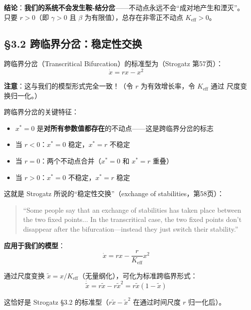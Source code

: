 \documentclass[12pt,a4paper]{article}
\begin{document}
\textbf{结论}：\textbf{我们的系统不会发生鞍-结分岔}——不动点永远不会``成对地产生和湮灭''。
只要 $r > 0$（即 $\gamma > 0$ 且 $\beta$ 为有限值），总存在非零正不动点 $K_{\text{eff}} > 0$。

\subsection{\S3.2 跨临界分岔：稳定性交换}

跨临界分岔（Transcritical Bifurcation）的标准型为（Strogatz 第57页）：
\begin{equation}
\dot{x} = r x - x^2
\end{equation}

\textbf{注意}：这与我们的模型形式完全一致！（令 $r$ 为有效增长率，令 $K_{\text{eff}}$ 通过
尺度变换归一化。）

跨临界分岔的关键特征：
\begin{itemize}
  \item $x^* = 0$ 是\textbf{对所有参数值都存在}的不动点——这是跨临界分岔的标志
  \item 当 $r < 0$：$x^* = 0$ 稳定，$x^* = r$ 不稳定
  \item 当 $r = 0$：两个不动点合并（$x^* = 0$ 和 $x^* = r$ 重叠）
  \item 当 $r > 0$：$x^* = 0$ 不稳定，$x^* = r$ 稳定
\end{itemize}

这就是 Strogatz 所说的``稳定性交换''（exchange of stabilities，第58页）：

\begin{quote}
\small
``Some people say that an exchange of stabilities has taken place between the two fixed points...
In the transcritical case, the two fixed points don't disappear after the bifurcation—instead
they just switch their stability.''
\end{quote}

\textbf{应用于我们的模型}：
\begin{equation}
\dot{x} = r x - \frac{r}{K_{\text{eff}}} x^2
\end{equation}

通过尺度变换 $\tilde{x} = x / K_{\text{eff}}$（无量纲化），可化为标准跨临界形式：
\begin{equation}
\dot{\tilde{x}} = r \tilde{x} - r \tilde{x}^2 = r \tilde{x}(1 - \tilde{x})
\end{equation}

这恰好是 Strogatz \S3.2 的标准型（$r\tilde{x} - \tilde{x}^2$ 在通过时间尺度 $r$ 归一化后）。
\end{document}
